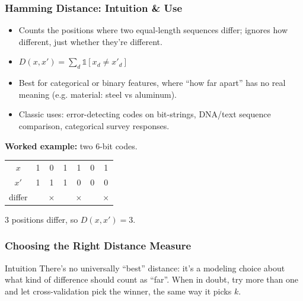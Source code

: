 \begin{frame}[fragile]\frametitle{Hamming Distance: Intuition \& Use}
\begin{itemize}
\item Counts the positions where two equal-length sequences differ; ignores how different,
just whether they're different.
\item $D(x,x') = \sum_d \mathbb{1}[x_d \neq x'_d]$
\item Best for categorical or binary features, where ``how far apart'' has no real meaning
(e.g. material: steel vs aluminum).
\item Classic uses: error-detecting codes on bit-strings, DNA/text sequence comparison,
categorical survey responses.
\end{itemize}

\textbf{Worked example:} two 6-bit codes.
\begin{center}
\begin{tabular}{c|cccccc}
$x$  & 1 & 0 & 1 & 1 & 0 & 1 \\
$x'$ & 1 & 1 & 1 & 0 & 0 & 0 \\
\hline
differ &  & $\times$ &  & $\times$ &  & $\times$ \\
\end{tabular}
\end{center}
3 positions differ, so $D(x,x')=3$.
\end{frame}

\begin{frame}[fragile]\frametitle{Choosing the Right Distance Measure}
\begin{center}
\end{center}
\begin{block}{Intuition}
There's no universally ``best'' distance: it's a modeling choice about what kind of
difference should count as ``far''. When in doubt, try more than one and let
cross-validation pick the winner, the same way it picks $k$.
\end{block}
\end{frame}

